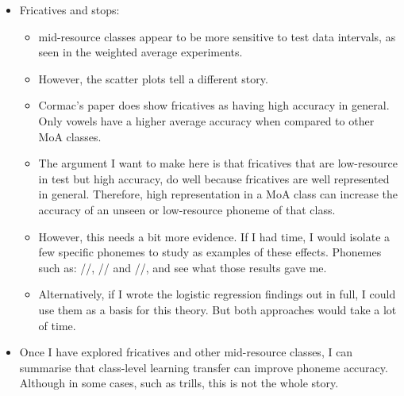 \begin{itemize}
    \item Fricatives and stops:  %
    \begin{itemize}
        \item mid-resource classes appear to be more sensitive to test data intervals, as seen in the weighted average experiments.
        \item However, the scatter plots tell a different story.
        \item Cormac's paper \cite{english2022domain} does show fricatives as having high accuracy in general. Only vowels have a higher average accuracy when compared to other MoA classes.
        \item The argument I want to make here is that fricatives that are low-resource in test but high accuracy, do well because fricatives are well represented in general. Therefore, high representation in a MoA class can increase the accuracy of an unseen or low-resource phoneme of that class.
        \item However, this needs a bit more evidence. If I had time, I would isolate a few specific phonemes to study as examples of these effects. Phonemes such as:  //, // and //, and see what those results gave me.
        \item Alternatively, if I wrote the logistic regression findings out in full, I could use them as a basis for this theory. But both approaches would take a lot of time.
    \end{itemize}
    \item Once I have explored fricatives and other mid-resource classes, I can summarise that class-level learning transfer can improve phoneme accuracy. Although in some cases, such as trills, this is not the whole story.
    \iffalse
    

\end{itemize}
